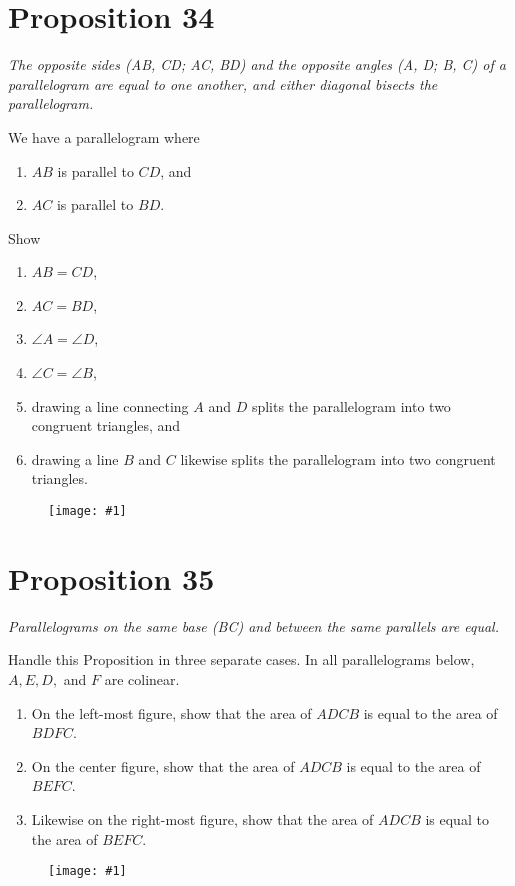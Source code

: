 \documentclass[openany]{book}
\newcommand{\diagram}[1]{
    \vspace*{\fill}
    \begin{figure}[H]
        \centering
        \texttt{[image: \#1]}
    \end{figure}
    \vspace*{\fill}
}
\newenvironment{proposition}
    {\begin{center}\em}
    {\end{center}}
\begin{document}
    \clearpage
    \section{Proposition 34}
    \begin{proposition}
    The opposite sides (AB, CD; AC, BD) and the opposite angles (A, D; B, C) of a parallelogram are equal to one
    another, and either diagonal bisects the parallelogram.
    \end{proposition}
    We have a parallelogram where
    \begin{enumerate}
        \item $AB$ is parallel to $CD$, and
        \item $AC$ is parallel to $BD$.
    \end{enumerate}
    Show
    \begin{enumerate}
        \item $AB = CD$,
        \item $AC = BD$,
        \item $\angle{A} = \angle{D}$,
        \item $\angle{C} = \angle{B}$,
        \item drawing a line connecting $A$ and $D$ splits the parallelogram into two congruent triangles, and
        \item drawing a line $B$ and $C$ likewise splits the parallelogram into two congruent triangles.
    \end{enumerate}
    \diagram{prop34.pdf}


    \clearpage
    \section{Proposition 35}
    \begin{proposition}
    Parallelograms on the same base (BC) and between the same parallels are equal.
    \end{proposition}
    Handle this Proposition in three separate cases. In all parallelograms below, $A, E, D,$ and $F$ are colinear.
    \begin{enumerate}
        \item On the left-most figure, show that the area of $ADCB$ is equal to the area of $BDFC$.
        \item On the center figure, show that the area of $ADCB$ is equal to the area of $BEFC$.
        \item Likewise on the right-most figure, show that the area of $ADCB$ is equal to the area of $BEFC$.
    \end{enumerate}
    \diagram{prop35.pdf}
\end{document}
